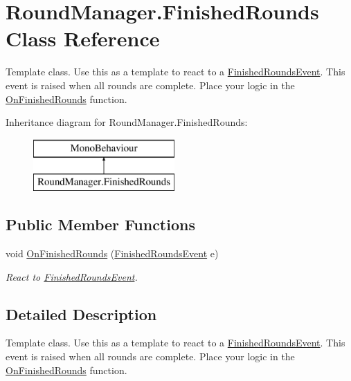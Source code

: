 \hypertarget{class_round_manager_1_1_finished_rounds}{}\section{Round\+Manager.\+Finished\+Rounds Class Reference}
\label{class_round_manager_1_1_finished_rounds}


Template class. Use this as a template to react to a \hyperlink{class_round_manager_1_1_events_1_1_finished_rounds_event}{Finished\+Rounds\+Event}. This event is raised when all rounds are complete. Place your logic in the \hyperlink{class_round_manager_1_1_finished_rounds_af2fcf6393affac3bc199d2b27f982d27}{On\+Finished\+Rounds} function.  


Inheritance diagram for Round\+Manager.\+Finished\+Rounds\+:\begin{figure}[H]
\begin{center}
\leavevmode
\includegraphics[height=2.000000cm]{class_round_manager_1_1_finished_rounds}
\end{center}
\end{figure}
\subsection*{Public Member Functions}
\begin{DoxyCompactItemize}
\item 
void \hyperlink{class_round_manager_1_1_finished_rounds_af2fcf6393affac3bc199d2b27f982d27}{On\+Finished\+Rounds} (\hyperlink{class_round_manager_1_1_events_1_1_finished_rounds_event}{Finished\+Rounds\+Event} e)
\begin{DoxyCompactList}\small\item\em React to \hyperlink{class_round_manager_1_1_events_1_1_finished_rounds_event}{Finished\+Rounds\+Event}. \end{DoxyCompactList}\end{DoxyCompactItemize}


\subsection{Detailed Description}
Template class. Use this as a template to react to a \hyperlink{class_round_manager_1_1_events_1_1_finished_rounds_event}{Finished\+Rounds\+Event}. This event is raised when all rounds are complete. Place your logic in the \hyperlink{class_round_manager_1_1_finished_rounds_af2fcf6393affac3bc199d2b27f982d27}{On\+Finished\+Rounds} function. 



